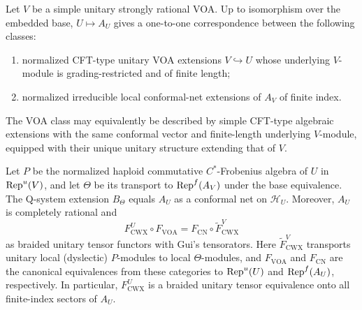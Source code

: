 \begin{corollary}
\label{cor:finite-index-extensions}
Let $V$ be a simple unitary strongly rational VOA. Up to isomorphism
over the embedded base, $U\mapsto A_U$ gives a one-to-one correspondence
between the following classes:
\begin{enumerate}[label=\textup{(\arabic*)}]
\item normalized CFT-type unitary VOA extensions $V\hookrightarrow U$
whose underlying $V$-module is grading-restricted and of finite length;
\item normalized irreducible local conformal-net extensions of $A_V$
of finite index.
\end{enumerate}
The VOA class may equivalently be described by simple CFT-type algebraic
extensions with the same conformal vector and finite-length underlying
$V$-module, equipped with their unique unitary structure extending that
of $V$.

Let $P$ be the normalized haploid commutative $C^*$-Frobenius algebra
of $U$ in $\operatorname{Rep}^u(V)$, and let $\Theta$ be its transport to
$\operatorname{Rep}^f(A_V)$ under the base equivalence. The Q-system extension
$B_\Theta$ equals $A_U$ as a conformal net on $\mathcal H_U$.
Moreover, $A_U$ is completely rational and
\[
 F^U_{\mathrm{CWX}}\circ F_{\mathrm{VOA}}
   =F_{\mathrm{CN}}\circ\widetilde F^V_{\mathrm{CWX}}
\]
as braided unitary tensor functors with Gui's tensorators. Here
$\widetilde F^V_{\mathrm{CWX}}$ transports unitary local (dyslectic)
$P$-modules to local $\Theta$-modules, and $F_{\mathrm{VOA}}$ and
$F_{\mathrm{CN}}$ are the canonical equivalences from these categories
to $\operatorname{Rep}^u(U)$ and $\operatorname{Rep}^f(A_U)$, respectively. In particular,
$F^U_{\mathrm{CWX}}$ is a braided unitary tensor equivalence onto all
finite-index sectors of $A_U$.
\end{corollary}


